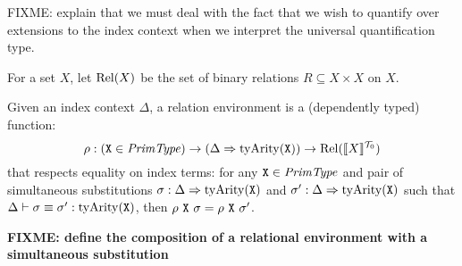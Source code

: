 FIXME: explain that we must deal with the fact that we wish to
quantify over extensions to the index context when we interpret the
universal quantification type.

For a set $X$, let $\mathrm{Rel}(X)$ be the set of binary relations $R
\subseteq X \times X$ on $X$.

Given an index context $\Delta$, a relation environment is a
(dependently typed) function:
\begin{displaymath}
  \rho : (\texttt{X} \in \mathit{PrimType}) \to (\Delta \Rightarrow \mathrm{tyArity}(\texttt{X})) \to \mathrm{Rel}(\llbracket X \rrbracket^{\mathcal{T}_0})
\end{displaymath}
that respects equality on index terms: for any $\texttt{X} \in
\mathit{PrimType}$ and pair of simultaneous substitutions $\sigma : \Delta
\Rightarrow \mathrm{tyArity}(\texttt{X})$ and $\sigma' : \Delta
\Rightarrow \mathrm{tyArity}(\texttt{X})$ such that $\Delta \vdash
\sigma \equiv \sigma' : \mathrm{tyArity}(\texttt{X})$, then $\rho\
\texttt{X}\ \sigma = \rho\ \texttt{X}\ \sigma'$.

\textbf{FIXME: define the composition of a relational environment with
  a simultaneous substitution}


